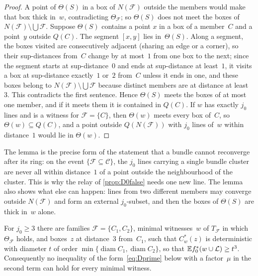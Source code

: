 \documentclass[11pt,letterpaper]{article}
\DeclareMathOperator{\diam}{diam}
\begin{document}
\begin{proof}
A point of $\Theta(S)$ in a box of $N(\mathcal F)$ outside the members would make that box thick in~$w$, contradicting $\Theta_{\mathcal F}$; so $\Theta(S)$ does not meet the boxes of $N(\mathcal F)\setminus\bigcup\mathcal F$. Suppose $\Theta(S)$ contains a point $x$ in a box of a member~$C$ and a point~$y$ outside $Q(C)$. The segment $[x,y]$ lies in~$\Theta(S)$. Along a segment, the boxes visited are consecutively adjacent (sharing an edge or a corner), so their sup-distances from~$C$ change by at most~$1$ from one box to the next; since the segment starts at sup-distance~$0$ and ends at sup-distance at least~$1$, it visits a box at sup-distance exactly~$1$ or~$2$ from~$C$ unless it ends in one, and these boxes belong to $N(\mathcal F)\setminus\bigcup\mathcal F$ because distinct members are at distance at least~$3$. This contradicts the first sentence. Hence $\Theta(S)$ meets the boxes of at most one member, and if it meets them it is contained in $Q(C)$. If $w$ has exactly $j_0$ lines and is a witness for $\mathcal F=\{C\}$, then $\Theta(w)$ meets every box of~$C$, so $\Theta(w)\subseteq Q(C)$, and a point outside $Q(N(\mathcal F))$ with $j_0$ lines of~$w$ within distance~$1$ would lie in $\Theta(w)$.
\end{proof}

The lemma is the precise form of the statement that a bundle cannot reconverge after its ring: on the event $\{\mathcal F\subseteq\mathcal C\}$, the $j_0$ lines carrying a single bundle cluster are never all within distance~$1$ of a point outside the neighbourhood of the cluster. This is why the relay of \cref{prop:D0false} needs one new line. The lemma also shows what else can happen: lines from two different members may converge outside $N(\mathcal F)$ and form an external $j_0$-subset, and then the boxes of $\Theta(S)$ are thick in~$w$ alone.

\begin{proposition}
\label{prop:nosup}
For $j_0\ge3$ there are families $\mathcal F=\{C_1,C_2\}$, minimal witnesses~$w$ of $T_{\mathcal F}$ in which $\Theta_{\mathcal F}$ holds, and boxes~$z$ at distance~$3$ from~$C_1$, such that $C^*_w(z)$ is deterministic with diameter $t$ of order $\min\{\diam C_1,\diam C_2\}$, so that $\mathbb E f^*_0(w\cup\mathcal L)\ge t^3$. Consequently no inequality of the form~\eqref{eq:Dprime} below with a factor~$\mu$ in the second term can hold for every minimal witness.
\end{proposition}
\end{document}
